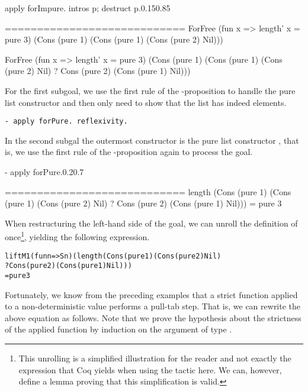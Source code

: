 \begin{cproof1}{apply forImpure. intros p; destruct p.}{0.15}{0.85}

  ============================
  ForFree (fun x => length' x = pure 3)
          (Cons (pure 1) (Cons (pure 1) (Cons (pure 2) Nil)))

  ForFree (fun x => length' x = pure 3)
          (Cons (pure 1) (Cons (pure 1) (Cons (pure 2) Nil)
          ? Cons (pure 2) (Cons (pure 1) Nil)))
\end{cproof1}

For the first subgoal, we use the first rule of the \--proposition to handle the pure list constructor and then only need to show that the list has indeed  elements.

\begin{verbatim}
- apply forPure. reflexivity.
\end{verbatim}

In the second subgal the outermost constructor is the pure list constructor , that is, we use the first rule of the \--proposition again to process the goal.

\begin{cproof1}{- apply forPure.}{0.2}{0.7}

  ============================
  length (Cons (pure 1) (Cons (pure 1) (Cons (pure 2) Nil)
         ? Cons (pure 2) (Cons (pure 1) Nil)))
  = pure 3
\end{cproof1}

When restructuring the left\--hand side of the goal, we can unroll the definition of  once\footnote{This unrolling is a simplified illustration for the reader and not exactly the expression that Coq yields when using the tactic  here. We can, however, define a lemma proving that this simplification is valid.}, yielding the following expression.

\begin{alltt}
  liftM1 (fun n => S n) (length (Cons (pure 1) (Cons (pure 2) Nil)
                                ? Cons (pure 2) (Cons (pure 1) Nil)))
  = pure 3
\end{alltt}

Fortunately, we know from the preceding examples that a strict function applied to a non\--deterministic value performs a pull\--tab step.
That is, we can rewrite the above equation as follows.
Note that we prove the hypothesis about the strictness of the applied function  by induction on the argument of type .

